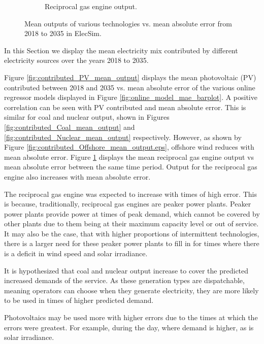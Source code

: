 \documentclass[final,3p,times,twocolumn,numbers]{elsarticle}
\begin{document}
\begin{figure}[h!]
\begin{subfigure}[b]{0.3\textwidth}
\caption{Reciprocal gas engine output.}
\label{fig:contributed_Recip_gas_mean_output}
\end{subfigure}
\label{fig:pv_coal_nuclear_offshore_outputs}
\caption{Mean outputs of various technologies vs. mean absolute error from 2018 to 2035 in ElecSim.}
\end{figure}

In this Section we display the mean electricity mix contributed by different electricity sources over the years 2018 to 2035. 

Figure \ref{fig:contributed_PV_mean_output} displays the mean photovoltaic (PV) contributed between 2018 and 2035 vs. mean absolute error of the various online regressor models displayed in Figure \ref{fig:online_model_mae_barplot}. A positive correlation can be seen with PV contributed and mean absolute error. This is similar for coal and nuclear output, shown in Figures \ref{fig:contributed_Coal_mean_output} and \ref{fig:contributed_Nuclear_mean_output} respectively. However, as shown by Figure \ref{fig:contributed_Offshore_mean_output.eps}, offshore wind reduces with mean absolute error. Figure \ref{fig:contributed_Recip_gas_mean_output} displays the mean reciprocal gas engine output vs mean absolute error between the same time period. Output for the reciprocal gas engine also increases with mean absolute error.

The reciprocal gas engine was expected to increase with times of high error. This is because, traditionally, reciprocal gas engines are peaker power plants. Peaker power plants provide power at times of peak demand, which cannot be covered by other plants due to them being at their maximum capacity level or out of service. It may also be the case, that with higher proportions of intermittent technologies, there is a larger need for these peaker power plants to fill in for times where there is a deficit in wind speed and solar irradiance.

It is hypothesized that coal and nuclear output increase to cover the predicted increased demands of the service. As these generation types are dispatchable, meaning operators can choose when they generate electricity, they are more likely to be used in times of higher predicted demand.

Photovoltaics may be used more with higher errors due to the times at which the errors were greatest. For example, during the day, where demand is higher, as is solar irradiance.


    
    
\end{document}
